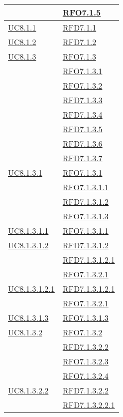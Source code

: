 \begin{longtable}{|>{\centering}m{5cm}|m{5cm}<{\centering}|}
& \hyperlink{RFO7.1.5}{RFO7.1.5}\\ \hline
\hyperref[UC8.1.1]{UC8.1.1} & \hyperlink{RFD7.1.1}{RFD7.1.1}\\ \hline
\hyperref[UC8.1.2]{UC8.1.2} & \hyperlink{RFD7.1.2}{RFD7.1.2}\\ \hline
\hyperref[UC8.1.3]{UC8.1.3} & \hyperlink{RFO7.1.3}{RFO7.1.3}\\
& \hyperlink{RFO7.1.3.1}{RFO7.1.3.1}\\
& \hyperlink{RFO7.1.3.2}{RFO7.1.3.2}\\
& \hyperlink{RFD7.1.3.3}{RFD7.1.3.3}\\
& \hyperlink{RFD7.1.3.4}{RFD7.1.3.4}\\
& \hyperlink{RFD7.1.3.5}{RFD7.1.3.5}\\
& \hyperlink{RFD7.1.3.6}{RFD7.1.3.6}\\
& \hyperlink{RFD7.1.3.7}{RFD7.1.3.7}\\ \hline
\hyperref[UC8.1.3.1]{UC8.1.3.1} & \hyperlink{RFO7.1.3.1}{RFO7.1.3.1}\\
& \hyperlink{RFO7.1.3.1.1}{RFO7.1.3.1.1}\\
& \hyperlink{RFD7.1.3.1.2}{RFD7.1.3.1.2}\\
& \hyperlink{RFO7.1.3.1.3}{RFO7.1.3.1.3}\\ \hline
\hyperref[UC8.1.3.1.1]{UC8.1.3.1.1} & \hyperlink{RFO7.1.3.1.1}{RFO7.1.3.1.1}\\ \hline
\hyperref[UC8.1.3.1.2]{UC8.1.3.1.2} & \hyperlink{RFD7.1.3.1.2}{RFD7.1.3.1.2}\\
& \hyperlink{RFD7.1.3.1.2.1}{RFD7.1.3.1.2.1}\\
& \hyperlink{RFO7.1.3.2.1}{RFO7.1.3.2.1}\\ \hline
\hyperref[UC8.1.3.1.2.1]{UC8.1.3.1.2.1} & \hyperlink{RFD7.1.3.1.2.1}{RFD7.1.3.1.2.1}\\
& \hyperlink{RFO7.1.3.2.1}{RFO7.1.3.2.1}\\ \hline
\hyperref[UC8.1.3.1.3]{UC8.1.3.1.3} & \hyperlink{RFO7.1.3.1.3}{RFO7.1.3.1.3}\\ \hline
\hyperref[UC8.1.3.2]{UC8.1.3.2} & \hyperlink{RFO7.1.3.2}{RFO7.1.3.2}\\
& \hyperlink{RFD7.1.3.2.2}{RFD7.1.3.2.2}\\
& \hyperlink{RFO7.1.3.2.3}{RFO7.1.3.2.3}\\
& \hyperlink{RFO7.1.3.2.4}{RFO7.1.3.2.4}\\ \hline
\hyperref[UC8.1.3.2.2]{UC8.1.3.2.2} & \hyperlink{RFD7.1.3.2.2}{RFD7.1.3.2.2}\\
& \hyperlink{RFD7.1.3.2.2.1}{RFD7.1.3.2.2.1}\\ \hline

\end{longtable}

